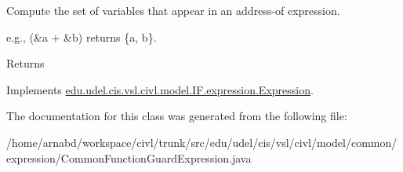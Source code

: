 Compute the set of variables that appear in an address-\/of expression. 

e.\+g., {\ttfamily (\&a + \&b)} returns {\ttfamily \{a, b\}}.

\begin{DoxyReturn}{Returns}

\end{DoxyReturn}


Implements \hyperlink{interfaceedu_1_1udel_1_1cis_1_1vsl_1_1civl_1_1model_1_1IF_1_1expression_1_1Expression_ac2ad0236534bec54b91ee78ff658cbe0}{edu.\+udel.\+cis.\+vsl.\+civl.\+model.\+I\+F.\+expression.\+Expression}.



The documentation for this class was generated from the following file\+:\begin{DoxyCompactItemize}
\item 
/home/arnabd/workspace/civl/trunk/src/edu/udel/cis/vsl/civl/model/common/expression/Common\+Function\+Guard\+Expression.\+java\end{DoxyCompactItemize}
